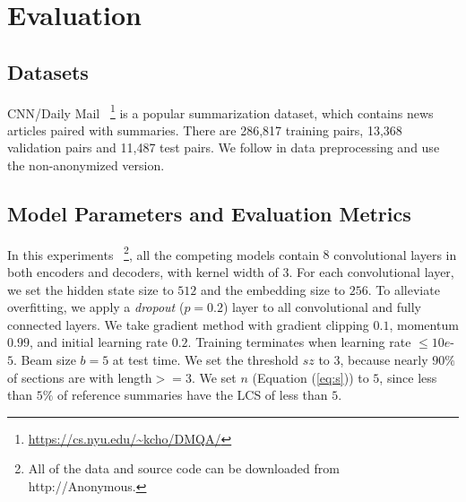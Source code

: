 \section{Evaluation}
\label{sec:eval}
\subsection{Datasets}
CNN/Daily Mail~\cite{HermannKGEKSB15}
\footnote{\url{https://cs.nyu.edu/~kcho/DMQA/}} 
is a popular summarization dataset, 
which contains news articles paired with summaries.
There are 286,817 training pairs,
13,368 validation pairs and 11,487 test pairs.
We follow \cite{SeeLM17} in data preprocessing and use 
the non-anonymized version.


\subsection{Model Parameters and Evaluation Metrics}
\label{sec:expset}
In this experiments
~\footnote{
All of the data and source code
can be downloaded from http://Anonymous.},
all the competing models contain $8$ convolutional layers in
both encoders and decoders, with kernel width of $3$.
For each convolutional layer, 
we set the hidden state size to $512$ and the embedding size to $256$.
To alleviate overfitting,
we apply a \textit{dropout} ($p=0.2$) layer to 
all convolutional and fully connected layers.
We take gradient method with gradient clipping $0.1$, momentum $0.99$,
and initial learning rate $0.2$.
Training terminates when learning rate $\le 10e$-$5$.
Beam size $b=5$ at test time.
We set the threshold $sz$ to $3$, 
because nearly $90\%$ 
of sections are with length$>=$3.
We set $n$ (Equation (\ref{eq:s})) to $5$,
since less than $5\%$ of reference summaries have
the LCS of less than $5$.

